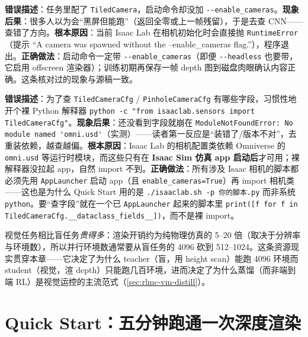 \begin{pitfall}
\textbf{错误描述}：任务里配了 \verb|TiledCamera|，启动命令却没加 \verb|--enable_cameras|。\textbf{现象后果}：很多人以为会“黑屏但能跑”（返回全零或上一帧残留），于是去查 CNN——查错了方向。\textbf{根本原因}：当前 Isaac Lab 在相机初始化时会直接抛 \verb|RuntimeError|（提示 “A camera was spawned without the --enable\_cameras flag.”），程序退出。\textbf{正确做法}：启动命令一定带 \verb|--enable_cameras|（即便 \verb|--headless| 也要带，它启用 offscreen 渲染器）；训练初期再保存一帧 depth 图到磁盘肉眼确认内容正确。这条核对过的现象与源稿一致。
\end{pitfall}

\begin{pitfall}
\textbf{错误描述}：为了查 \verb|TiledCameraCfg| / \verb|PinholeCameraCfg| 有哪些字段，习惯性地开个裸 Python 解释器 \verb|python -c "from isaaclab.sensors import TiledCameraCfg"|。\textbf{现象后果}：还没看到字段就崩在 \verb|ModuleNotFoundError: No module named 'omni.usd'|（实测）——读者第一反应是“装错了/版本不对”，去重装依赖，越查越偏。\textbf{根本原因}：Isaac Lab 的相机配置类依赖 Omniverse 的 \verb|omni.usd| 等运行时模块，而这些只有在 \textbf{Isaac Sim 仿真 app 启动后}才可用；裸解释器没拉起 app，自然 import 不到。\textbf{正确做法}：所有涉及 Isaac 相机的脚本都必须先用 \verb|AppLauncher| 启动 app（且 \verb|enable_cameras=True|）再 import 相机类——这也是为什么 Quick Start 用的是 \verb|./isaaclab.sh -p 你的脚本.py| 而非系统 \verb|python|。要“查字段”就在一个已 \verb|AppLauncher| 起来的脚本里 \verb|print([f for f in TiledCameraCfg.__dataclass_fields__])|，而不是裸 import。
\end{pitfall}

视觉任务相比盲任务\emph{贵得多}：渲染开销约为纯物理仿真的 5--20 倍（取决于分辨率与环境数），所以并行环境数通常要从盲任务的 4096 砍到 512--1024。这条资源现实贯穿本章——它决定了为什么 teacher（盲，用 height scan）能跑 4096 环境而 student（视觉，渲 depth）只能跑几百环境，进而决定了为什么蒸馏（而非端到端 RL）是视觉运控的主流范式（\cref{sec:rlmc-vm-distill}）。

\section{Quick Start：五分钟跑通一次深度渲染}
\label{sec:rlmc-vm-quickstart}

